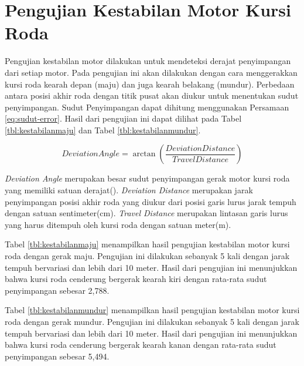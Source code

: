 \section{Pengujian Kestabilan Motor Kursi Roda}

Pengujian kestabilan motor dilakukan untuk mendeteksi derajat penyimpangan dari setiap motor. Pada pengujian ini akan dilakukan dengan cara menggerakkan kursi roda kearah depan (maju) dan juga kearah belakang (mundur). Perbedaan antara posisi akhir roda dengan titik pusat akan diukur untuk menentukan sudut penyimpangan. Sudut Penyimpangan dapat dihitung menggunakan Persamaan \ref{eq:sudut-error}. Hasil dari pengujian ini dapat dilihat pada Tabel \ref{tbl:kestabilanmaju} dan Tabel \ref{tbl:kestabilanmundur}.

\begin{equation}
  \label{eq:sudut-error}
  Deviation Angle = \arctan \left ( \frac{Deviation Distance}{Travel Distance} \right )
\end{equation}

\emph{Deviation Angle} merupakan besar sudut penyimpangan gerak motor kursi roda yang memiliki satuan derajat(\textdegree). \emph{Deviation Distance} merupakan jarak penyimpangan posisi akhir roda yang diukur dari posisi garis lurus jarak tempuh dengan satuan sentimeter(cm). \emph{Travel Distance} merupakan lintasan garis lurus yang harus ditempuh oleh kursi roda dengan satuan meter(m).

Tabel \ref{tbl:kestabilanmaju} menampilkan hasil pengujian kestabilan motor kursi roda dengan gerak maju. Pengujian ini dilakukan sebanyak 5 kali dengan jarak tempuh bervariasi dan lebih dari 10 meter. Hasil dari pengujian ini menunjukkan bahwa kursi roda cenderung bergerak kearah kiri dengan rata-rata sudut penyimpangan sebesar 2,788\textdegree.

Tabel \ref{tbl:kestabilanmundur} menampilkan hasil pengujian kestabilan motor kursi roda dengan gerak mundur. Pengujian ini dilakukan sebanyak 5 kali dengan jarak tempuh bervariasi dan lebih dari 10 meter. Hasil dari pengujian ini menunjukkan bahwa kursi roda cenderung bergerak kearah kanan dengan rata-rata sudut penyimpangan sebesar 5,494\textdegree.

